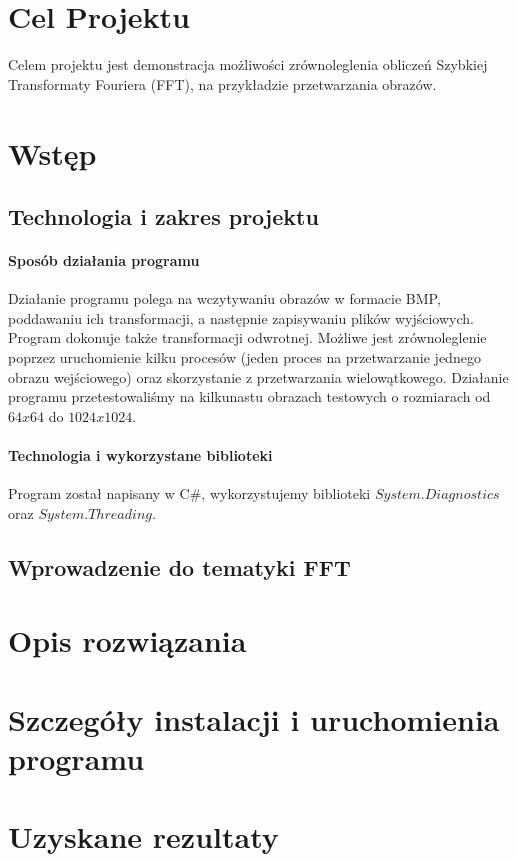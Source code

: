 \section{Cel Projektu}
Celem projektu jest demonstracja możliwości zrównoleglenia obliczeń Szybkiej Transformaty Fouriera (FFT), na przykładzie przetwarzania obrazów.
\section{Wstęp}
\subsection{Technologia i zakres projektu}
\paragraph{Sposób działania programu}
Działanie programu polega na wczytywaniu obrazów w formacie BMP, poddawaniu ich
transformacji, a następnie zapisywaniu plików wyjściowych. Program dokonuje także transformacji odwrotnej. Możliwe jest zrównoleglenie poprzez uruchomienie kilku procesów (jeden proces na przetwarzanie jednego obrazu wejściowego) oraz skorzystanie z przetwarzania wielowątkowego. Działanie programu przetestowaliśmy na kilkunastu obrazach testowych o rozmiarach od $ 64x64 $ do $ 1024x1024 $.
\paragraph{Technologia i wykorzystane biblioteki}Program został napisany w C\#, wykorzystujemy biblioteki $ System.Diagnostics $ oraz $ System.Threading $.
\subsection{Wprowadzenie do tematyki FFT}
\section{Opis rozwiązania}
\section{Szczegóły instalacji i uruchomienia programu}
\section{Uzyskane rezultaty}
